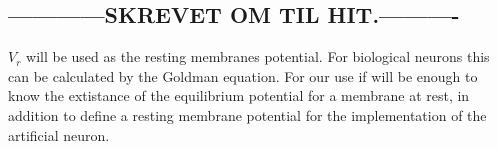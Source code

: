 

















\subsection{------------SKREVET OM TIL HIT.----------}





$V_{r}$ will be used as the resting membranes potential. For biological neurons this can be calculated by the Goldman equation\cite{PrinciplesOfNeuralScience4edKAP07}. 
For our use if will be enough to know the extistance of the equilibrium potential for a membrane at rest,
in addition to define a resting membrane potential for the implementation of the artificial neuron.




